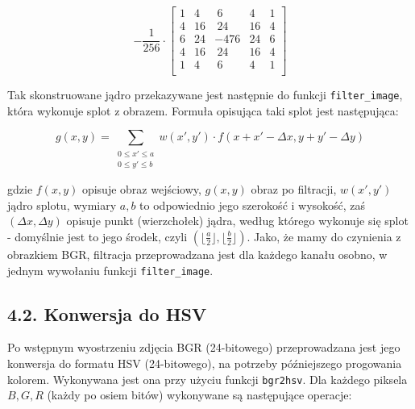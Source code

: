 \documentclass[11pt,a4paper,twoside]{report}
\begin{document}
			\[
				-\frac{1}{256} \cdot
				\begin{bmatrix}
					1 &  4 &   ~6 &  4 & 1 \\
					4 & 16 &  ~24 & 16 & 4 \\
					6 & 24 & -476 & 24 & 6 \\
					4 & 16 &  ~24 & 16 & 4 \\
					1 &  4 &   ~6 &  4 & 1 \\
				\end{bmatrix}
			\]

			Tak skonstruowane jądro przekazywane jest następnie do funkcji \texttt{filter\_image}, która wykonuje splot z obrazem. Formuła opisująca taki splot jest następująca:

			\[
				g(x, y) = \sum_{\substack{0 \leq x' \leq a \\ 0 \leq y' \leq b}} w(x', y') \cdot f(x + x' - \Delta x, y + y' - \Delta y)
			\]

			gdzie $f(x, y)$ opisuje obraz wejściowy, $g(x, y)$ obraz po filtracji, $w(x', y')$ jądro splotu, wymiary $a, b$ to odpowiednio jego szerokość i wysokość, zaś $(\Delta x, \Delta y)$ opisuje punkt (wierzchołek) jądra, według którego wykonuje się splot - domyślnie jest to jego środek, czyli $(\lfloor \frac{a}{2} \rfloor, \lfloor \frac{b}{2} \rfloor)$. Jako, że mamy do czynienia z obrazkiem BGR, filtracja przeprowadzana jest dla każdego kanału osobno, w jednym wywołaniu funkcji \texttt{filter\_image}.

	\subsection*{4.2. Konwersja do HSV}

			Po wstępnym wyostrzeniu zdjęcia BGR (24-bitowego) przeprowadzana jest jego konwersja do formatu HSV (24-bitowego), na potrzeby późniejszego progowania kolorem. Wykonywana jest ona przy użyciu funkcji \texttt{bgr2hsv}. Dla każdego piksela $B, G, R$ (każdy po osiem bitów) wykonywane są następujące operacje:
\end{document}
